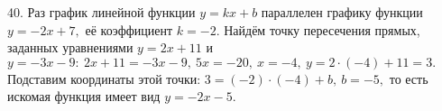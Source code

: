 40. Раз график линейной функции $y=kx+b$ параллелен графику функции $y=-2x+7,$ её коэффициент $k=-2.$ Найдём точку пересечения прямых, заданных уравнениями $y=2x+11$ и $y=-3x-9:\ 2x+11=-3x-9,\ 5x=-20,\ x=-4,\ y=2\cdot(-4)+11=3.$ Подставим координаты этой точки: $3=(-2)\cdot(-4)+b,\ b=-5,$ то есть искомая функция имеет вид $y=-2x-5.$\\
